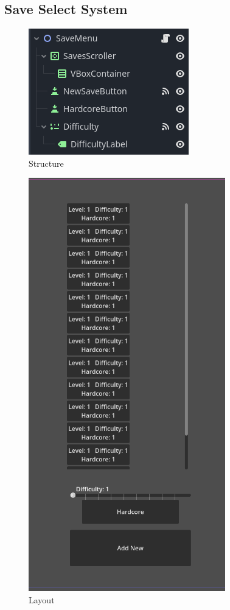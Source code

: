 \documentclass{article}
\begin{document}
        \subsection{Save Select System}
        \begin{multicols}{2}
        \begin{figure}[H]
                \centering
                \includegraphics[width = 0.8\columnwidth]{images/development/SaveMenu_structure.PNG}
                \caption{Structure}
        \end{figure}
        \begin{figure}[H]
                \centering
                \includegraphics[width = 0.5\columnwidth]{images/development/SaveMenu_layout.PNG}
                \caption{Layout}
        \end{figure}
        \end{multicols}
\end{document}
